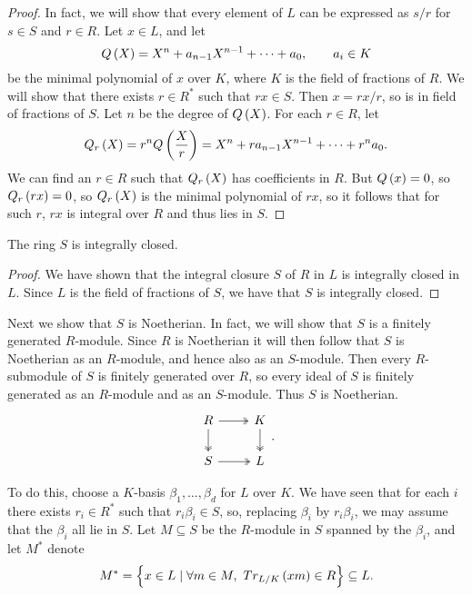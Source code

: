 \begin{proof}
In fact, we will show that every element of $ L $ can be expressed as $ s / r $ for $ s \in S $ and $ r \in R $. Let $ x \in L $, and let
$$ Q\br{X} = X^n + a_{n - 1}X^{n - 1} + \dots + a_0, \qquad a_i \in K $$
be the minimal polynomial of $ x $ over $ K $, where $ K $ is the field of fractions of $ R $. We will show that there exists $ r \in R^* $ such that $ rx \in S $. Then $ x = rx / r $, so is in field of fractions of $ S $. Let $ n $ be the degree of $ Q\br{X} $. For each $ r \in R $, let
$$ Q_r\br{X} = r^nQ\br{\dfrac{X}{r}} = X^n + ra_{n - 1}X^{n - 1} + \dots + r^na_0. $$
We can find an $ r \in R $ such that $ Q_r\br{X} $ has coefficients in $ R $. But $ Q\br{x} = 0 $, so $ Q_r\br{rx} = 0 $, so $ Q_r\br{X} $ is the minimal polynomial of $ rx $, so it follows that for such $ r $, $ rx $ is integral over $ R $ and thus lies in $ S $.
\end{proof}

\begin{corollary}
The ring $ S $ is integrally closed.
\end{corollary}

\begin{proof}
We have shown that the integral closure $ S $ of $ R $ in $ L $ is integrally closed in $ L $. Since $ L $ is the field of fractions of $ S $, we have that $ S $ is integrally closed.
\end{proof}

Next we show that $ S $ is Noetherian. In fact, we will show that $ S $ is a finitely generated $ R $-module. Since $ R $ is Noetherian it will then follow that $ S $ is Noetherian as an $ R $-module, and hence also as an $ S $-module. Then every $ R $-submodule of $ S $ is finitely generated over $ R $, so every ideal of $ S $ is finitely generated as an $ R $-module and as an $ S $-module. Thus $ S $ is Noetherian.
$$
\begin{tikzcd}
R \arrow[twoheadrightarrow]{r} \arrow[twoheadrightarrow]{d} & K \arrow[twoheadrightarrow]{d} \\
S \arrow[twoheadrightarrow]{r} & L
\end{tikzcd}.
$$


To do this, choose a $ K $-basis $ \beta_1, \dots, \beta_d $ for $ L $ over $ K $. We have seen that for each $ i $ there exists $ r_i \in R^* $ such that $ r_i\beta_i \in S $, so, replacing $ \beta_i $ by $ r_i\beta_i $, we may assume that the $ \beta_i $ all lie in $ S $. Let $ M \subseteq S $ be the $ R $-module in $ S $ spanned by the $ \beta_i $, and let $ M^* $ denote
$$ M^* = \cbr{x \in L \mid \forall m \in M, \ Tr_{L / K}\br{xm} \in R} \subseteq L. $$

